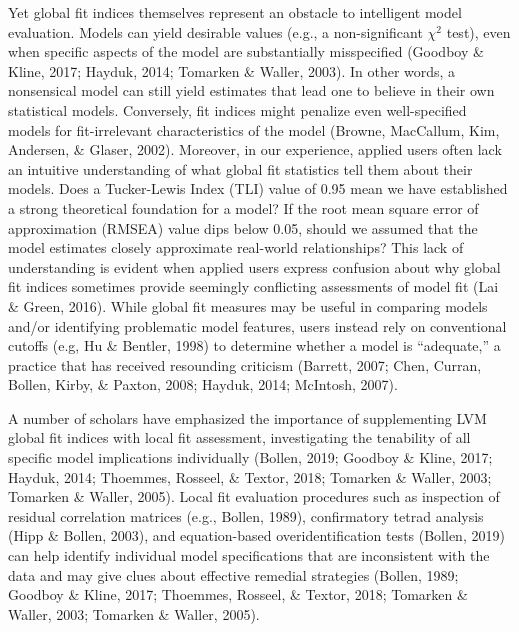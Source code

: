 \documentclass[
  english,
  man]{apa6}
\begin{document}
Yet global fit indices themselves represent an obstacle to intelligent model evaluation. Models can yield desirable values (e.g., a non-significant \(\chi^2\) test), even when specific aspects of the model are substantially misspecified (Goodboy \& Kline, 2017; Hayduk, 2014; Tomarken \& Waller, 2003). In other words, a nonsensical model can still yield estimates that lead one to believe in their own statistical models. Conversely, fit indices might penalize even well-specified models for fit-irrelevant characteristics of the model (Browne, MacCallum, Kim, Andersen, \& Glaser, 2002). Moreover, in our experience, applied users often lack an intuitive understanding of what global fit statistics tell them about their models. Does a Tucker-Lewis Index (TLI) value of 0.95 mean we have established a strong theoretical foundation for a model? If the root mean square error of approximation (RMSEA) value dips below 0.05, should we assumed that the model estimates closely approximate real-world relationships? This lack of understanding is evident when applied users express confusion about why global fit indices sometimes provide seemingly conflicting assessments of model fit (Lai \& Green, 2016). While global fit measures may be useful in comparing models and/or identifying problematic model features, users instead rely on conventional cutoffs (e.g, Hu \& Bentler, 1998) to determine whether a model is ``adequate,'' a practice that has received resounding criticism (Barrett, 2007; Chen, Curran, Bollen, Kirby, \& Paxton, 2008; Hayduk, 2014; McIntosh, 2007).

A number of scholars have emphasized the importance of supplementing LVM global fit indices with local fit assessment, investigating the tenability of all specific model implications individually (Bollen, 2019; Goodboy \& Kline, 2017; Hayduk, 2014; Thoemmes, Rosseel, \& Textor, 2018; Tomarken \& Waller, 2003; Tomarken \& Waller, 2005). Local fit evaluation procedures such as inspection of residual correlation matrices (e.g., Bollen, 1989), confirmatory tetrad analysis (Hipp \& Bollen, 2003), and equation-based overidentification tests (Bollen, 2019) can help identify individual model specifications that are inconsistent with the data and may give clues about effective remedial strategies (Bollen, 1989; Goodboy \& Kline, 2017; Thoemmes, Rosseel, \& Textor, 2018; Tomarken \& Waller, 2003; Tomarken \& Waller, 2005).
\end{document}
